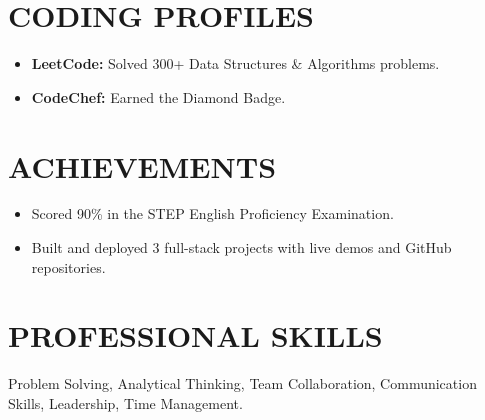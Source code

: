 \documentclass[10pt,letterpaper]{article}
\begin{document}
\section*{CODING PROFILES}
\begin{itemize}[leftmargin=*, itemsep=4pt, topsep=2pt, parsep=0pt, label=\textbullet]
    \item \textbf{LeetCode:} Solved 300+ Data Structures \& Algorithms problems.
    \item \textbf{CodeChef:} Earned the Diamond Badge.
\end{itemize}

\section*{ACHIEVEMENTS}
\begin{itemize}[leftmargin=*, itemsep=4pt, topsep=2pt, parsep=0pt, label=\textbullet]
    \item Scored 90\% in the STEP English Proficiency Examination.
    \item Built and deployed 3 full-stack projects with live demos and GitHub repositories.
\end{itemize}

\section*{PROFESSIONAL SKILLS}
\noindent Problem Solving, Analytical Thinking, Team Collaboration, Communication Skills, Leadership, Time Management.
\end{document}
